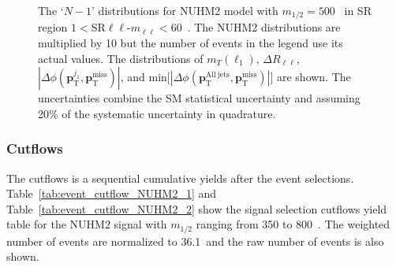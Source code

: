 \begin{figure}[htbp]
    \caption{The `$N-1$' distributions for NUHM2 model with $m_{1/2} = 500$~{\GeV} in SR region $1 < $SR$\ell \ell$-$m_{\ell \ell} < 60$~{\GeV}.
    The NUHM2 distributions are multiplied by 10 but the number of events in the legend use its actual values.
    The distributions of $m_{T}(\ell_{1})$, $\Delta R_{\ell \ell}$, $|\Delta \phi(\mathbf{p}_\mathrm{T}^{j_{1}}, \mathbf{p}_\mathrm{T}^\mathrm{miss})|$, and min[$|\Delta \phi(\mathbf{p}_\mathrm{T}^\mathrm{All\ jets}, \mathbf{p}_\mathrm{T}^\mathrm{miss})|$] are shown.
    The uncertainties combine the SM statistical uncertainty and assuming 20\% of the systematic uncertainty in quadrature.}
    \label{fig:event_nuhm2_kinematic_in_SR_SFOS_3}
\end{figure}


\subsubsection{Cutflows}
\label{subsubsec:event_cutflows}
The cutflows is a sequential cumulative yields after the event selections.
Table~\ref{tab:event_cutflow_NUHM2_1} and Table~\ref{tab:event_cutflow_NUHM2_2} show the signal selection cutflows yield table for the NUHM2 signal with $m_{1/2}$ ranging from 350 to 800~{\GeV}.
The weighted number of events are normalized to 36.1~\ifb and the raw number of events is also shown.

